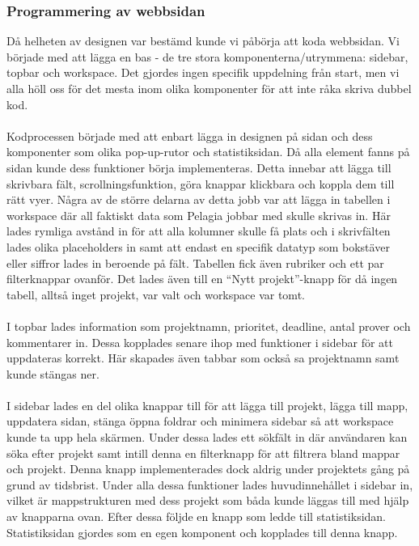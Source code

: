 \subsubsection{Programmering av webbsidan}
Då helheten av designen var bestämd kunde vi påbörja att koda webbsidan. Vi började med att lägga en bas - de tre stora komponenterna/utrymmena: sidebar, topbar och workspace. Det gjordes ingen specifik uppdelning från start, men vi alla höll oss för det mesta inom olika komponenter för att inte råka skriva dubbel kod. 
\\
\\
Kodprocessen började med att enbart lägga in designen på sidan och dess komponenter som olika pop-up-rutor och statistiksidan. Då alla element fanns på sidan kunde dess funktioner börja implementeras. Detta innebar att lägga till skrivbara fält, scrollningsfunktion, göra knappar klickbara och koppla dem till rätt vyer. Några av de större delarna av detta jobb var att lägga in tabellen i workspace där all faktiskt data som Pelagia jobbar med skulle skrivas in. Här lades rymliga avstånd in för att alla kolumner skulle få plats och i skrivfälten lades olika placeholders in samt att endast en specifik datatyp som bokstäver eller siffror lades in beroende på fält. Tabellen fick även rubriker och ett par filterknappar ovanför. Det lades även till en “Nytt projekt”-knapp för då ingen tabell, alltså inget projekt, var valt och workspace var tomt. 
\\
\\
I topbar lades information som projektnamn, prioritet, deadline, antal prover och kommentarer in. Dessa kopplades senare ihop med funktioner i sidebar för att uppdateras korrekt. Här skapades även tabbar som också sa projektnamn samt kunde stängas ner. 
\\
\\
I sidebar lades en del olika knappar till för att lägga till projekt, lägga till mapp, uppdatera sidan, stänga öppna foldrar och minimera sidebar så att workspace kunde ta upp hela skärmen. Under dessa lades ett sökfält in där användaren kan söka efter projekt samt intill denna en filterknapp för att filtrera bland mappar och projekt. Denna knapp implementerades dock aldrig under projektets gång på grund av tidsbrist. Under alla dessa funktioner lades huvudinnehållet i sidebar in, vilket är mappstrukturen med dess projekt som båda kunde läggas till med hjälp av knapparna ovan. Efter dessa följde en knapp som ledde till statistiksidan. Statistiksidan gjordes som en egen komponent och kopplades till denna knapp.


